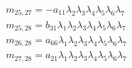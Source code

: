 \documentclass{article}
\begin{document}
\begin{align*}
&m_{25,27}=-a_{11} \lambda_{2} \lambda_{3} \lambda_{4} \lambda_{5} \lambda_{6} \lambda_{7}\\
&m_{25,28}=b_{31} \lambda_{1} \lambda_{2} \lambda_{3} \lambda_{4} \lambda_{5} \lambda_{6} \lambda_{7}\\
&m_{26,28}=a_{66} \lambda_{1} \lambda_{2} \lambda_{3} \lambda_{4} \lambda_{5} \lambda_{6} \lambda_{7}\\
&m_{27,28}=a_{21} \lambda_{1} \lambda_{2} \lambda_{3} \lambda_{4} \lambda_{5} \lambda_{6} \lambda_{7}\\
\end{align*}
\end{document}
